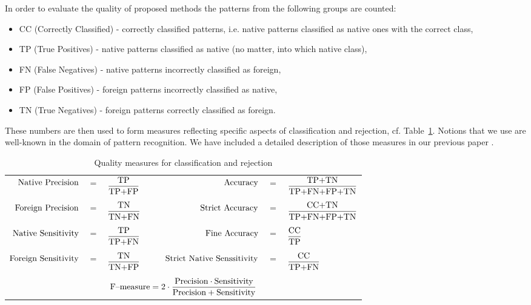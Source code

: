\documentclass{llncs}
\begin{document}
In order to evaluate the quality of proposed methods the patterns from the following groups are counted:
\begin{itemize}
\item CC  (Correctly Classified) - correctly classified patterns, i.e. native patterns classified as native ones with the correct class,
\item TP  (True Positives) - native patterns classified as native (no matter, into which native class),
\item FN  (False Negatives) - native patterns incorrectly classified as foreign,
\item FP  (False Positives) - foreign patterns incorrectly classified as native,
\item TN  (True Negatives) - foreign patterns correctly classified as foreign.
\end{itemize}
These numbers are then used to form measures reflecting specific aspects of classification and rejection, cf. Table~\ref{tab:measures}. Notions that we use are well-known in the domain of pattern recognition. We have included a detailed description of those measures in our previous paper \cite{HomendaICAART2015}.
\begin{table}[!htbp]
\centering
\caption{Quality measures for classification and rejection}
{\small
\begin{tabular}{rclrcl}
  $\textnormal{Native Precision}$ &$=$& $\displaystyle\frac{\textnormal{TP}}{\textnormal{TP+FP}}$ & 
  $\textnormal{Accuracy}$ &$=$& $\displaystyle\frac{\textnormal{TP+TN}}{\textnormal{TP+FN+FP+TN}}$ \\
  &&&&&\\
  $\textnormal{Foreign Precision}$ &$=$& $\displaystyle\frac{\textnormal{TN}}{\textnormal{TN+FN}}$ &
  $\textnormal{Strict Accuracy}$ &$=$& $\displaystyle\frac{\textnormal{CC+TN}}{\textnormal{TP+FN+FP+TN}}$ \\
  &&&&&\\
  $\textnormal{Native Sensitivity}$ &$=$& $\displaystyle\frac{\textnormal{TP}}{\textnormal{TP+FN}}$ &
  $\textnormal{Fine Accuracy}$ &$=$& $\displaystyle\frac{\textnormal{CC}}{\textnormal{TP}}$ \\
  &&&&&\\
  $\textnormal{Foreign Sensitivity}$ &$=$& $\displaystyle\frac{\textnormal{TN}}{\textnormal{TN+FP}}$ &
  $\hspace{18pt}\textnormal{Strict Native Senssitivity}$ &$=$& $\displaystyle\frac{\textnormal{CC}}{\textnormal{TP+FN}}$\\
  &&&&&\\
  \multicolumn{6}{c}{$\textnormal{F--measure}=2\cdot\displaystyle\frac{\textnormal{Precision}\cdot\textnormal{Sensitivity}}{\textnormal{Precision}+\textnormal{Sensitivity}}$}\\
\end{tabular}
}
\label{tab:measures}
\end{table}
\end{document}
